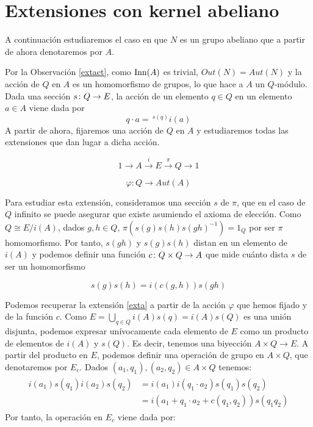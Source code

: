 
\section{Extensiones con kernel abeliano}\label{sec:ab}

A continuación estudiaremos el caso en que $N$ es un grupo abeliano que a partir de ahora denotaremos por $A$. 

Por la Observación \ref{extact}, como $\operatorname{Inn}(A)$ es trivial, $Out(N)=Aut(N)$ y la acción de $Q$ en $A$ es un homomorfismo de grupos, lo que hace a $A$ un $Q$-módulo. Dada una sección $s\colon Q\to E$, la acción de un elemento $q\in Q$ en un elemento $a\in A$ viene dada por
\begin{equation}
	q\cdot a = \,^{s(q)}i(a)
\end{equation}
A partir de ahora, fijaremos una acción de $Q$ en $A$ y estudiaremos todas las extensiones que dan lugar a dicha acción.

\begin{equation}\label{exta}
	1\to A\xrightarrow{i} E\xrightarrow{\pi} Q\to 1
\end{equation}

\begin{equation}
	\varphi \colon Q \to Aut(A)
\end{equation}

Para estudiar esta extensión, consideramos una sección $s$ de $\pi$, que en el caso de $Q$ infinito se puede asegurar que existe asumiendo el axioma de elección. Como $Q\cong E/i(A)$, dados $g,h\in Q$, $\pi\left(s(g)s(h)s(gh)^{-1}\right) = 1_{Q}$ por ser $\pi$ homomorfismo. Por tanto, $s(gh)$ y $s(g)s(h)$ distan en un elemento de $i(A)$ y podemos definir una función $c\colon Q\times Q\to A$ que mide cuánto dista $s$ de ser un homomorfismo

\begin{equation}\label{eq:factorsystem}
	s(g)s(h) = i\left(c(g,h)\right)s(gh)
\end{equation}

Podemos recuperar la extensión \eqref{exta} a partir de la acción $\varphi$ que hemos fijado y de la función $c$. 
Como $E=\bigcup\limits_{q\in Q} i(A)s(q) = i(A)s(Q)$ es una unión disjunta, podemos expresar unívocamente cada elemento de $E$ como un producto de elementos de $i(A)$ y $s(Q)$. Es decir, tenemos una biyección $A\times Q \to E$. A partir del producto en $E$, podemos definir una operación de grupo en $A\times Q$, que denotaremos por $E_{c}$. Dados $(a_1,q_1),(a_2,q_2)\in A\times Q$ tenemos:
\begin{align}\begin{split}
i(a_1)s(q_1)i(a_2)s(q_2) &= i(a_1)i(q_1\cdot a_2)s(q_1)s(q_2) \\ &= i(a_1+ q_1\cdot a_2 + c(q_1,q_2))s(q_1q_2)
\end{split}\end{align}
\noindent Por tanto, la operación en $E_c$ viene dada por:

